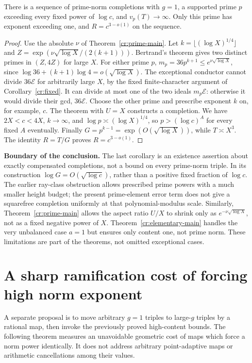 \begin{corollary}
\label{cr:growing}
There is a sequence of prime-norm completions with $g=1$, a supported prime
$p$ exceeding every fixed power of $\log c$, and $v_p(T)\to\infty$.
Only this prime has exponent exceeding one, and $R=c^{3-o(1)}$ on the sequence.
\end{corollary}
\begin{proof}
Use the absolute $\nu$ of Theorem~\ref{cr:prime-main}. Let
$k=\lfloor(\log X)^{1/4}\rfloor$ and
$Z=\exp(\nu\sqrt{\log X}/(2(k+1)))$. Bertrand's theorem gives two distinct
primes in $(Z,4Z)$ for large $X$. For either prime $p$,
$m_p=36p^{k+1}\le e^{\nu\sqrt{\log X}}$, since
$\log36+(k+1)\log4=o(\sqrt{\log X})$.
The exceptional conductor cannot divide $36\mathcal E$ for arbitrarily large
$X$, by the fixed finite-character argument of Corollary~\ref{cr:fixed}.
It can divide at most one of the two ideals $m_p\mathcal E$: otherwise it
would divide their gcd, $36\mathcal E$. Choose the other prime and prescribe
exponent $k$ on, for example, $c$. The theorem with $U=X$ constructs a
completion. We have $2X<c<4X$, $k\to\infty$, and
$\log p\asymp(\log X)^{1/4}$, so $p>(\log c)^A$ for every fixed $A$
eventually. Finally $G=p^{k-1}=\exp(O(\sqrt{\log X}))$, while
$T\asymp X^3$. The identity $R=T/G$ proves $R=c^{3-o(1)}$.
\end{proof}

\noindent\textbf{Boundary of the conclusion.}
The last corollary is an existence assertion about exactly compensated
completions, not a bound on every prime-norm triple. In its construction
$\log G=O(\sqrt{\log c})$, rather than a positive fixed fraction of $\log c$.
The earlier ray-class obstruction allows prescribed prime powers with a much
smaller height budget; the present prime-element error term does not give a
squarefree completion uniformly at that polynomial-modulus scale. Similarly,
Theorem~\ref{cr:prime-main} allows the aspect ratio $U/X$ to shrink only as
$e^{-\nu\sqrt{\log X}}$, not as a fixed negative power of $X$.
Theorem~\ref{cr:elementary-main} handles the very unbalanced case $a=1$ but
ensures only content one, not prime norm. These limitations are part of the
theorems, not omitted exceptional cases.

\section{A sharp ramification cost of forcing high norm exponent}
\label{cr:ramification}
A separate proposal is to move arbitrary $g=1$ triples to large-$g$ triples
by a rational map, then invoke the previously proved high-content bounds.
The following theorem measures an unavoidable geometric cost of maps which
force a norm power identically. It does not address arbitrary point-adaptive
maps or arithmetic cancellations among their values.

